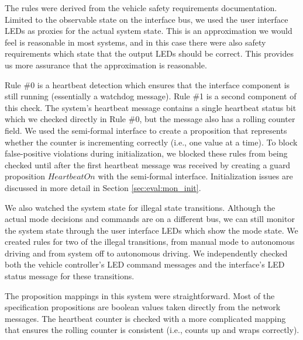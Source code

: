 The rules were derived from the vehicle safety requirements documentation. 
Limited to the observable state on the interface bus, we used the user interface LEDs as proxies for the actual system state. 
This is an approximation we would feel is reasonable in most systems, and in this case there were also safety requirements which state that the output LEDs should be correct. This provides us more assurance that the approximation is reasonable.

Rule \#0 is a heartbeat detection which ensures that the interface component is still running (essentially a watchdog message). Rule \#1 is a second component of this check. The system's heartbeat message contains a single heartbeat status bit which we checked directly in Rule \#0, but the message also has a rolling counter field. 
We used the semi-formal interface to create a proposition that represents whether the counter is incrementing correctly (i.e., one value at a time). To block false-positive violations during initialization, we blocked these rules from being checked until after the first heartbeat message was received by creating a guard proposition $HeartbeatOn$ with the semi-formal interface. 
Initialization issues are discussed in more detail in Section \ref{sec:eval:mon_init}. 

We also watched the system state for illegal state transitions. Although the actual mode decisions and commands are on a different bus, we can still monitor the system state through the user interface LEDs which show the mode state. 
We created rules for two of the illegal transitions, from manual mode to autonomous driving and from system off to autonomous driving. We independently checked both the vehicle controller's LED command messages and the interface's LED status message for these transitions.

The proposition mappings in this system were straightforward. Most of the specification propositions are boolean values taken directly from the network messages. The heartbeat counter is checked with a more complicated mapping that ensures the rolling counter is consistent (i.e., counts up and wraps correctly).

